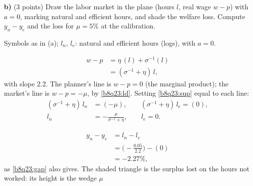 \textbf{b)} (3 points) Draw the labor market in the plane (hours $l$, real wage $w-p$) with $a=0$, marking natural and efficient
hours, and shade the welfare loss. Compute $y_n-y_e$ and the loss for $\mu=5\%$ at the calibration.
\resolespaco
\begin{sol}
\begin{notacao}
\item Symbols as in (a); $l_n$, $l_e$: natural and efficient hours (logs), with $a=0$.
\end{notacao}
\begin{align}
w-p&=\eta\,(l)+\sigma^{-1}(l)\nonumber\\
&=(\sigma^{-1}+\eta)\,l, \label{b8q23:sup}
\end{align}
with slope 2.2. The planner's line is $w-p=0$ (the marginal product); the market's line is $w-p=-\mu$, by \eqref{b8q23:ld}.
Setting \eqref{b8q23:sup} equal to each line:
\begin{align}
(\sigma^{-1}+\eta)\,l_n&=(-\mu),\qquad (\sigma^{-1}+\eta)\,l_e=(0),\nonumber\\
l_n&=-\frac{\mu}{\sigma^{-1}+\eta},\qquad l_e=0. \label{b8q23:ln}
\end{align}
\begin{center}
\end{center}
\begin{align*}
y_n-y_e&=l_n-l_e\\
&=\Big(-\frac{0.05}{2.2}\Big)-(0)\\
&=-2.27\%,
\end{align*}
as \eqref{b8q23:gap} also gives. The shaded triangle is the surplus lost on the hours not worked: its height is the wedge $\mu$

\end{sol}
